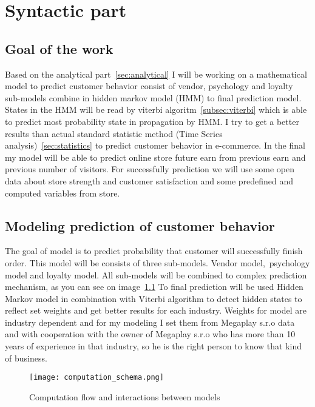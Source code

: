 
\chapter{Syntactic part}
\label{sec:methodology}
\section{Goal of the work} \label{sec:goal}
Based on the analytical part~\ref{sec:analytical} I will be working on a mathematical model to predict customer behavior consist of vendor,
psychology and loyalty sub-models combine in hidden markov model (HMM) to final prediction model.
States in the HMM will be read by viterbi algoritm~\ref{subsec:viterbi} which is able to predict most probability state in propagation by HMM.
I try to get a better results than actual standard statistic method (Time Series analysis)~\ref{sec:statistics} to predict customer behavior in e-commerce.
In the final my model will be able to predict online store future earn from previous earn and previous number of visitors.
For successfully prediction we will use some open data about store strength and customer satisfaction and some predefined and computed variables from store.
\section{Modeling prediction of customer behavior} \label{sec:modeling}
The goal of model is to predict probability that customer will successfully finish order.
This model will be consists of three sub-models.
Vendor model,\ psychology model and loyalty model.
All sub-models will be combined to complex prediction mechanism, as you can see on image~\ref{Model schema with interaction}
To final prediction will be used Hidden Markov model in combination with Viterbi algorithm to detect hidden states to reflect set weights and get better results for each industry.
Weights for model are industry dependent and for my modeling I set them from Megaplay s.r.o data and with cooperation with the owner of Megaplay s.r.o who has more than 10 years of experience in that industry, so he is the right person to know that kind of business.
\\
\begin{figure}[h!]
    \begin{center}
        \texttt{[image: computation\_schema.png]}
    \end{center}
    \caption{Computation flow and interactions between models}
    \label{Model schema with interaction}
\end{figure}
\\
